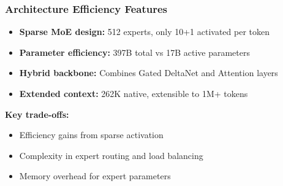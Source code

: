 \begin{frame}

\frametitle{Architecture Efficiency Features}

\begin{itemize}
    \item \textbf{Sparse MoE design:} 512 experts, only 10+1 activated per token
    \item \textbf{Parameter efficiency:} 397B total vs 17B active parameters
    \item \textbf{Hybrid backbone:} Combines Gated DeltaNet and Attention layers
    \item \textbf{Extended context:} 262K native, extensible to 1M+ tokens
\end{itemize}

\vspace{0.5cm}
\textbf{Key trade-offs:}
\begin{itemize}
    \item Efficiency gains from sparse activation
    \item Complexity in expert routing and load balancing
    \item Memory overhead for expert parameters
\end{itemize}
\end{frame}